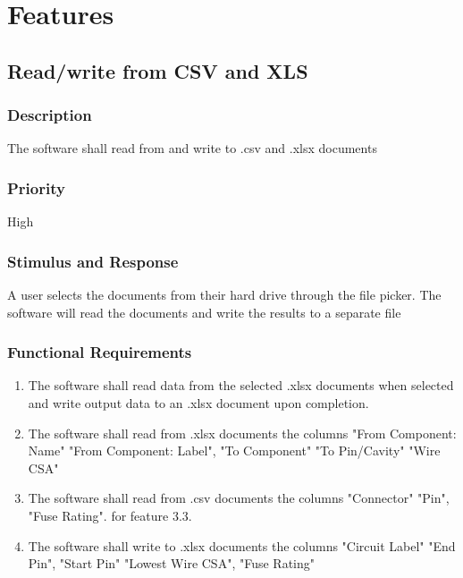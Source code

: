 \section{Features}

\subsection{Read/write from CSV and XLS}
\subsubsection{Description}
The software shall read from and write to .csv and .xlsx documents

\subsubsection{Priority}
High 

\subsubsection{Stimulus and Response}
 A user selects the documents from their hard drive through the file picker. The software will read the documents and write the results to a separate file

\subsubsection{Functional Requirements}

\begin{enumerate}


 
\item  The software shall read data from the selected .xlsx documents when selected
 and write output data to an .xlsx document upon completion.

 \item The software shall read from .xlsx documents the columns "From Component: Name" "From Component: Label", "To Component" "To Pin/Cavity" "Wire CSA"

 \item The software shall read from .csv documents the columns "Connector" "Pin", "Fuse Rating". for feature 3.3.

 \item The software shall write to .xlsx documents the columns "Circuit Label" "End Pin", "Start Pin" "Lowest Wire CSA", "Fuse Rating"
 \end{enumerate}
 

